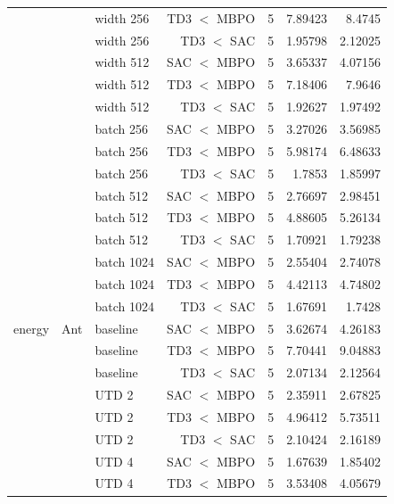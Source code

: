 {\begin{longtable}{@{}lllrrrr@{}}
     &  & width 256 & TD3 $<$ MBPO & \num{5} & \num{7.89423} & \num{8.4745} \\
     &  & width 256 & TD3 $<$ SAC & \num{5} & \num{1.95798} & \num{2.12025} \\
     &  & width 512 & SAC $<$ MBPO & \num{5} & \num{3.65337} & \num{4.07156} \\
     &  & width 512 & TD3 $<$ MBPO & \num{5} & \num{7.18406} & \num{7.9646} \\
     &  & width 512 & TD3 $<$ SAC & \num{5} & \num{1.92627} & \num{1.97492} \\
     &  & batch 256 & SAC $<$ MBPO & \num{5} & \num{3.27026} & \num{3.56985} \\
     &  & batch 256 & TD3 $<$ MBPO & \num{5} & \num{5.98174} & \num{6.48633} \\
     &  & batch 256 & TD3 $<$ SAC & \num{5} & \num{1.7853} & \num{1.85997} \\
     &  & batch 512 & SAC $<$ MBPO & \num{5} & \num{2.76697} & \num{2.98451} \\
     &  & batch 512 & TD3 $<$ MBPO & \num{5} & \num{4.88605} & \num{5.26134} \\
     &  & batch 512 & TD3 $<$ SAC & \num{5} & \num{1.70921} & \num{1.79238} \\
     &  & batch 1024 & SAC $<$ MBPO & \num{5} & \num{2.55404} & \num{2.74078} \\
     &  & batch 1024 & TD3 $<$ MBPO & \num{5} & \num{4.42113} & \num{4.74802} \\
     &  & batch 1024 & TD3 $<$ SAC & \num{5} & \num{1.67691} & \num{1.7428} \\
    \midrule
    energy & Ant & baseline & SAC $<$ MBPO & \num{5} & \num{3.62674} & \num{4.26183} \\
     &  & baseline & TD3 $<$ MBPO & \num{5} & \num{7.70441} & \num{9.04883} \\
     &  & baseline & TD3 $<$ SAC & \num{5} & \num{2.07134} & \num{2.12564} \\
     &  & UTD 2 & SAC $<$ MBPO & \num{5} & \num{2.35911} & \num{2.67825} \\
     &  & UTD 2 & TD3 $<$ MBPO & \num{5} & \num{4.96412} & \num{5.73511} \\
     &  & UTD 2 & TD3 $<$ SAC & \num{5} & \num{2.10424} & \num{2.16189} \\
     &  & UTD 4 & SAC $<$ MBPO & \num{5} & \num{1.67639} & \num{1.85402} \\
     &  & UTD 4 & TD3 $<$ MBPO & \num{5} & \num{3.53408} & \num{4.05679} \\

\end{longtable}}
